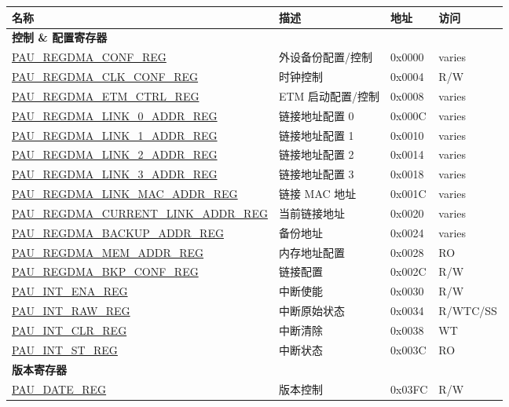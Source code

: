 \begin{longtable}{ | l | p{6cm} | p{1.3cm} | p{1.5cm} | }
\hline\rowcolor{lightgray}
\textbf{名称} & \textbf{描述} &  \textbf{地址} & \textbf{访问} \\ \hline
\endhead
\multicolumn{4}{|l|}{\textbf{控制 \& 配置寄存器}} \\ \hline
\hyperref[regdesc:PAUREGDMACONFREG]{PAU\_REGDMA\_CONF\_REG} & 外设备份配置/控制 & 0x0000 & varies \\ \hline
\hyperref[regdesc:PAUREGDMACLKCONFREG]{PAU\_REGDMA\_CLK\_CONF\_REG} & 时钟控制 & 0x0004 & R/W \\ \hline
\hyperref[regdesc:PAUREGDMAETMCTRLREG]{PAU\_REGDMA\_ETM\_CTRL\_REG} & ETM 启动配置/控制 & 0x0008 & varies \\ \hline
\hyperref[regdesc:PAUREGDMALINK0ADDRREG]{PAU\_REGDMA\_LINK\_0\_ADDR\_REG} & 链接地址配置 0 & 0x000C & varies \\ \hline
\hyperref[regdesc:PAUREGDMALINK1ADDRREG]{PAU\_REGDMA\_LINK\_1\_ADDR\_REG} & 链接地址配置 1 & 0x0010 & varies \\ \hline
\hyperref[regdesc:PAUREGDMALINK2ADDRREG]{PAU\_REGDMA\_LINK\_2\_ADDR\_REG} & 链接地址配置 2 & 0x0014 & varies \\ \hline
\hyperref[regdesc:PAUREGDMALINK3ADDRREG]{PAU\_REGDMA\_LINK\_3\_ADDR\_REG} & 链接地址配置 3 & 0x0018 & varies \\ \hline
\hyperref[regdesc:PAUREGDMALINKMACADDRREG]{PAU\_REGDMA\_LINK\_MAC\_ADDR\_REG} & 链接 MAC 地址 & 0x001C & varies \\ \hline
\hyperref[regdesc:PAUREGDMACURRENTLINKADDRREG]{PAU\_REGDMA\_CURRENT\_LINK\_ADDR\_REG} & 当前链接地址 & 0x0020 & varies \\ \hline
\hyperref[regdesc:PAUREGDMABACKUPADDRREG]{PAU\_REGDMA\_BACKUP\_ADDR\_REG} & 备份地址 & 0x0024 & varies \\ \hline
\hyperref[regdesc:PAUREGDMAMEMADDRREG]{PAU\_REGDMA\_MEM\_ADDR\_REG} & 内存地址配置 & 0x0028 & RO \\ \hline
\hyperref[regdesc:PAUREGDMABKPCONFREG]{PAU\_REGDMA\_BKP\_CONF\_REG} & 链接配置 & 0x002C & R/W \\ \hline
\hyperref[regdesc:PAUINTENAREG]{PAU\_INT\_ENA\_REG} & 中断使能 & 0x0030 & R/W \\ \hline
\hyperref[regdesc:PAUINTRAWREG]{PAU\_INT\_RAW\_REG} & 中断原始状态 & 0x0034 & R/\-WTC/\-SS \\ \hline
\hyperref[regdesc:PAUINTCLRREG]{PAU\_INT\_CLR\_REG} & 中断清除 & 0x0038 & WT \\ \hline
\hyperref[regdesc:PAUINTSTREG]{PAU\_INT\_ST\_REG} & 中断状态 & 0x003C & RO \\ \hline
\multicolumn{4}{|l|}{\textbf{版本寄存器}} \\ \hline
\hyperref[regdesc:PAUDATEREG]{PAU\_DATE\_REG} & 版本控制 & 0x03FC & R/W \\ \hline
\end{longtable}